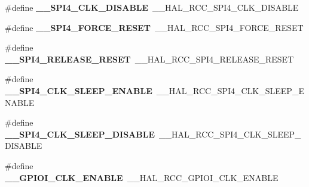 \begin{DoxyCompactItemize}
\item 
\#define {\bfseries \+\_\+\+\_\+\+S\+P\+I4\+\_\+\+C\+L\+K\+\_\+\+D\+I\+S\+A\+B\+LE}~\+\_\+\+\_\+\+H\+A\+L\+\_\+\+R\+C\+C\+\_\+\+S\+P\+I4\+\_\+\+C\+L\+K\+\_\+\+D\+I\+S\+A\+B\+LE\hypertarget{group___h_a_l___r_c_c___aliased_ga8903b53e01525864794aed36ce5283b2}{}\label{group___h_a_l___r_c_c___aliased_ga8903b53e01525864794aed36ce5283b2}

\item 
\#define {\bfseries \+\_\+\+\_\+\+S\+P\+I4\+\_\+\+F\+O\+R\+C\+E\+\_\+\+R\+E\+S\+ET}~\+\_\+\+\_\+\+H\+A\+L\+\_\+\+R\+C\+C\+\_\+\+S\+P\+I4\+\_\+\+F\+O\+R\+C\+E\+\_\+\+R\+E\+S\+ET\hypertarget{group___h_a_l___r_c_c___aliased_gab55fe3173b3e14b97dd5c87cd99162b2}{}\label{group___h_a_l___r_c_c___aliased_gab55fe3173b3e14b97dd5c87cd99162b2}

\item 
\#define {\bfseries \+\_\+\+\_\+\+S\+P\+I4\+\_\+\+R\+E\+L\+E\+A\+S\+E\+\_\+\+R\+E\+S\+ET}~\+\_\+\+\_\+\+H\+A\+L\+\_\+\+R\+C\+C\+\_\+\+S\+P\+I4\+\_\+\+R\+E\+L\+E\+A\+S\+E\+\_\+\+R\+E\+S\+ET\hypertarget{group___h_a_l___r_c_c___aliased_ga13c41edae57cfce264235a5568811bd5}{}\label{group___h_a_l___r_c_c___aliased_ga13c41edae57cfce264235a5568811bd5}

\item 
\#define {\bfseries \+\_\+\+\_\+\+S\+P\+I4\+\_\+\+C\+L\+K\+\_\+\+S\+L\+E\+E\+P\+\_\+\+E\+N\+A\+B\+LE}~\+\_\+\+\_\+\+H\+A\+L\+\_\+\+R\+C\+C\+\_\+\+S\+P\+I4\+\_\+\+C\+L\+K\+\_\+\+S\+L\+E\+E\+P\+\_\+\+E\+N\+A\+B\+LE\hypertarget{group___h_a_l___r_c_c___aliased_ga9a82b81c574e15e53a930f9c8b127bf1}{}\label{group___h_a_l___r_c_c___aliased_ga9a82b81c574e15e53a930f9c8b127bf1}

\item 
\#define {\bfseries \+\_\+\+\_\+\+S\+P\+I4\+\_\+\+C\+L\+K\+\_\+\+S\+L\+E\+E\+P\+\_\+\+D\+I\+S\+A\+B\+LE}~\+\_\+\+\_\+\+H\+A\+L\+\_\+\+R\+C\+C\+\_\+\+S\+P\+I4\+\_\+\+C\+L\+K\+\_\+\+S\+L\+E\+E\+P\+\_\+\+D\+I\+S\+A\+B\+LE\hypertarget{group___h_a_l___r_c_c___aliased_ga8b79d6fbaf0e6f31f8f4dfccc92fef26}{}\label{group___h_a_l___r_c_c___aliased_ga8b79d6fbaf0e6f31f8f4dfccc92fef26}

\item 
\#define {\bfseries \+\_\+\+\_\+\+G\+P\+I\+O\+I\+\_\+\+C\+L\+K\+\_\+\+E\+N\+A\+B\+LE}~\+\_\+\+\_\+\+H\+A\+L\+\_\+\+R\+C\+C\+\_\+\+G\+P\+I\+O\+I\+\_\+\+C\+L\+K\+\_\+\+E\+N\+A\+B\+LE\hypertarget{group___h_a_l___r_c_c___aliased_gac43fbb6a098998ec56d389906b708b8c}{}\label{group___h_a_l___r_c_c___aliased_gac43fbb6a098998ec56d389906b708b8c}


\end{DoxyCompactItemize}
